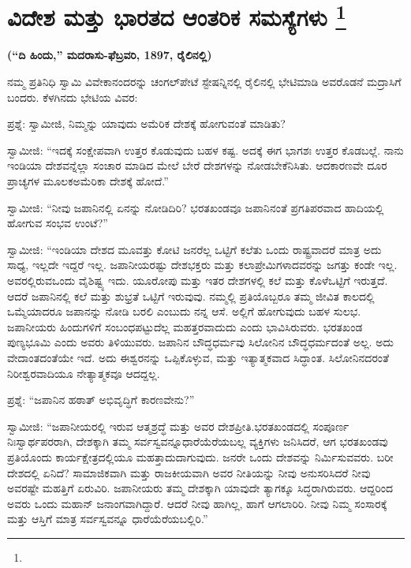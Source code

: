 
\chapter[ವಿದೇಶ ಮತ್ತು ಭಾರತದ ಆಂತರಿಕ ಸಮಸ್ಯೆಗಳು ]{ವಿದೇಶ ಮತ್ತು ಭಾರತದ ಆಂತರಿಕ ಸಮಸ್ಯೆಗಳು \protect\footnote{}}

\centerline{\textbf{(“ದಿ ಹಿಂದು,” ಮದರಾಸು-ಫೆಬ್ರವರಿ, 1897, ರೈಲಿನಲ್ಲಿ)}}

\vskip 0.4cm

ನಮ್ಮ ಪ್ರತಿನಿಧಿ ಸ್ವಾಮಿ ವಿವೇಕಾನಂದರನ್ನು ಚಂಗಲ್​ಪೇಟೆ ಸ್ಟೇಷನ್ನಿನಲ್ಲಿ ರೈಲಿನಲ್ಲಿ ಭೇಟಿಮಾಡಿ ಅವರೊಡನೆ ಮದ್ರಾಸಿಗೆ ಬಂದರು. ಕೆಳಗಿನದು ಭೇಟಿಯ ವಿವರ:

\vskip 2pt

ಪ್ರಶ್ನೆ: ಸ್ವಾಮೀಜಿ, ನಿಮ್ಮನ್ನು ಯಾವುದು ಅಮೆರಿಕ ದೇಶಕ್ಕೆ ಹೋಗುವಂತೆ ಮಾಡಿತು?

\vskip 2pt

ಸ್ವಾಮೀಜಿ: “ಇದಕ್ಕೆ ಸಂಕ್ಷೇಪವಾಗಿ ಉತ್ತರ ಕೊಡುವುದು ಬಹಳ ಕಷ್ಟ. ಅದಕ್ಕೆ ಈಗ ಭಾಗಶಃ ಉತ್ತರ ಕೊಡಬಲ್ಲೆ. ನಾನು ಇಂಡಿಯಾ ದೇಶವನ್ನೆಲ್ಲಾ ಸಂಚಾರ ಮಾಡಿದ ಮೇಲೆ ಬೇರೆ ದೇಶಗಳನ್ನು ನೋಡಬೇಕೆನಿಸಿತು. ಆದಕಾರಣವೇ ದೂರ ಪ್ರಾಚ್ಯಗಳ ಮೂಲಕ\break ಅಮೆರಿಕಾ ದೇಶಕ್ಕೆ ಹೋದೆ.”

\vskip 2pt

ಸ್ವಾಮೀಜಿ: “ನೀವು ಜಪಾನಿನಲ್ಲಿ ಏನನ್ನು ನೋಡಿದಿರಿ? ಭರತಖಂಡವೂ ಜಪಾನಿನಂತೆ ಪ್ರಗತಿಪರವಾದ ಹಾದಿಯಲ್ಲಿ ಹೋಗುವ ಸಂಭವ ಉಂಟೆ?”

\vskip 2pt

ಸ್ವಾಮೀಜಿ: “ಇಂಡಿಯಾ ದೇಶದ ಮೂವತ್ತು ಕೋಟಿ ಜನರೆಲ್ಲ ಒಟ್ಟಿಗೆ ಕಲೆತು ಒಂದು ರಾಷ್ಟ್ರವಾದರೆ ಮಾತ್ರ ಅದು ಸಾಧ್ಯ, ಇಲ್ಲದೇ ಇದ್ದರೆ ಇಲ್ಲ. ಜಪಾನೀಯರಷ್ಟು ದೇಶಭಕ್ತರು ಮತ್ತು ಕಲಾಪ್ರೇಮಿಗಳಾದವರನ್ನು ಜಗತ್ತು ಕಂಡೇ ಇಲ್ಲ. ಅವರಲ್ಲಿರುವ\break ಒಂದು ವೈಶಿಷ್ಟ್ಯ ಇದು. ಯೂರೋಪು ಮತ್ತು ಇತರ ದೇಶಗಳಲ್ಲಿ ಕಲೆ ಮತ್ತು ಕೊಳೆ\break ಒಟ್ಟಿಗೆ ಇರುತ್ತದೆ. ಆದರೆ ಜಪಾನಿನಲ್ಲಿ ಕಲೆ ಮತ್ತು ಶುಭ್ರತೆ ಒಟ್ಟಿಗೆ ಇರುವುವು. ನಮ್ಮಲ್ಲಿ ಪ್ರತಿಯೊಬ್ಬರೂ ತಮ್ಮ ಜೀವಿತ ಕಾಲದಲ್ಲಿ ಒಮ್ಮೆಯಾದರೂ ಜಪಾನನ್ನು ನೋಡಿ ಬರಲಿ ಎಂಬುದು ನನ್ನ ಆಸೆ. ಅಲ್ಲಿಗೆ ಹೋಗುವುದು ಬಹಳ ಸುಲಭ. ಜಪಾನೀಯರು ಹಿಂದುಗಳಿಗೆ ಸಂಬಂಧಪಟ್ಟುದೆಲ್ಲ ಮಹತ್ತರವಾದುದು ಎಂದು ಭಾವಿಸಿರುವರು. ಭರತಖಂಡ ಪುಣ್ಯಭೂಮಿ ಎಂದು ಅವರು ತಿಳಿಯುವರು. ಜಪಾನಿನ ಬೌದ್ಧಧರ್ಮವು ಸಿಲೋನಿನ ಬೌದ್ಧಧರ್ಮದಂತೆ ಅಲ್ಲ. ಅದು ವೇದಾಂತದಂತೆಯೇ ಇದೆ. ಅದು ಈಶ್ವರನನ್ನು ಒಪ್ಪಿಕೊಳ್ಳುವ, ಮತ್ತು ಇತ್ಯಾತ್ಮಕವಾದ ಸಿದ್ಧಾಂತ. ಸಿಲೋನಿನದರಂತೆ ನಿರೀಶ್ವರವಾದಿಯೂ ನೇತ್ಯಾತ್ಮಕವೂ ಆದದ್ದಲ್ಲ.

\vskip 2pt

ಪ್ರಶ್ನೆ: “ಜಪಾನಿನ ಹಠಾತ್​ ಅಭಿವೃದ್ಧಿಗೆ ಕಾರಣವೇನು?”

\vskip 2pt

ಸ್ವಾಮೀಜಿ: “ಜಪಾನೀಯರಲ್ಲಿ ಇರುವ ಆತ್ಮಶ್ರದ್ಧೆ ಮತ್ತು ಅವರ ದೇಶಪ್ರೀತಿ.\break ಭರತಖಂಡದಲ್ಲಿ ಸಂಪೂರ್ಣ ನಿಃಸ್ವಾರ್ಥಪರರಾಗಿ, ದೇಶಕ್ಕಾಗಿ ತಮ್ಮ ಸರ್ವಸ್ವವನ್ನೂ\break ಧಾರೆಯೆರೆಯಬಲ್ಲ ವ್ಯಕ್ತಿಗಳು ಜನಿಸಿದರೆ, ಆಗ ಭರತಖಂಡವು ಪ್ರತಿಯೊಂದು ಕಾರ್ಯಕ್ಷೇತ್ರದಲ್ಲಿಯೂ ಮಹತ್ತಾದುದಾಗುವುದು. ಜನರೇ ಒಂದು ದೇಶವನ್ನು ನಿರ್ಮಿಸುವವರು. ಬರೀ ದೇಶದಲ್ಲಿ ಏನಿದೆ? ಸಾಮಾಜಿಕವಾಗಿ ಮತ್ತು ರಾಜಕೀಯವಾಗಿ ಅವರ ನೀತಿಯನ್ನು ನೀವು ಅನುಸರಿಸಿದರೆ ನೀವು ಅವರಷ್ಟೇ ಮಹತ್ತಿಗೆ ಏರುವಿರಿ. ಜಪಾನೀಯರು ತಮ್ಮ ದೇಶಕ್ಕಾಗಿ ಯಾವುದೇ ತ್ಯಾಗಕ್ಕೂ ಸಿದ್ಧರಾಗಿರುವರು. ಆದ್ದರಿಂದ ಅವರು ಒಂದು ಮಹಾನ್​ ಜನಾಂಗವಾಗಿದ್ದಾರೆ. ಆದರೆ ನೀವು ಹಾಗಿಲ್ಲ, ಹಾಗೆ ಆಗಲಾರಿರಿ. ನೀವು ನಿಮ್ಮ ಸಂಸಾರಕ್ಕೆ ಮತ್ತು ಆಸ್ತಿಗೆ ಮಾತ್ರ ಸರ್ವಸ್ವವನ್ನೂ ಧಾರೆಯೆರೆಯಬಲ್ಲಿರಿ.”

